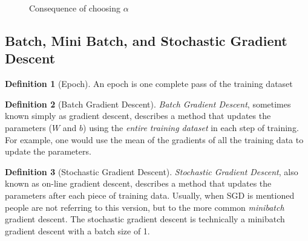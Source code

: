 \documentclass[11pt]{article}
\numberwithin{equation}{section}
\theoremstyle{definition}%
\newtheorem{definition}{Definition}[section]%
\begin{document}
\begin{figure}[h]%
    \centering
    \qquad
    \caption{Consequence of choosing $\alpha$ \cite{Cornell}}%
    \label{fig:learningrate_example}%
\end{figure}

\subsection{Batch, Mini Batch, and Stochastic Gradient Descent}

\begin{definition} [Epoch]
    An epoch is one complete pass of the training dataset
\end{definition}

\begin{definition}[Batch Gradient Descent]
    \emph{Batch Gradient Descent}, sometimes known simply as gradient descent, describes a method that updates the parameters ($W$ and $b$) using the \emph{entire training dataset} in each step of training. For example, one would use the mean of the gradients of all the training data to update the parameters. %
\end{definition}

\begin{definition}[Stochastic Gradient Descent]
    \emph{Stochastic Gradient Descent}, also known as on-line gradient descent, describes a method that updates the parameters after each piece of training data. Usually, when SGD is mentioned people are not referring to this version, but to the more common \emph{minibatch} gradient descent. The stochastic gradient descent is technically a minibatch gradient descent with a batch size of 1. 
\end{definition}
\end{document}
